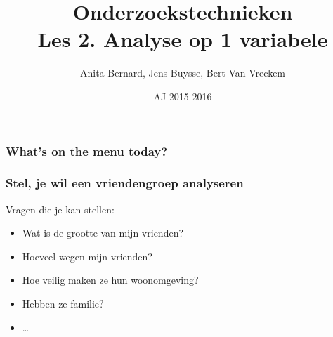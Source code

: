 \documentclass{beamer}
\title[Intro]{Onderzoekstechnieken\\Les 2. Analyse op 1 variabele}
\author{Anita Bernard, Jens Buysse, Bert {Van Vreckem}}
\date{AJ 2015-2016}
\begin{document}

\HoGentLogo

\titleframe


\begin{frame}
  \frametitle{What's on the menu today?}

  \tableofcontents
\end{frame}

\begin{frame}
  \frametitle{Stel, je wil een vriendengroep analyseren}

  Vragen die je kan stellen:

  \begin{itemize}
    \item Wat is de grootte van mijn vrienden?
    \item Hoeveel wegen mijn vrienden?
    \item Hoe veilig maken ze hun woonomgeving?
    \item Hebben ze familie?
    \item \ldots
  \end{itemize}
\end{frame}
\end{document}
